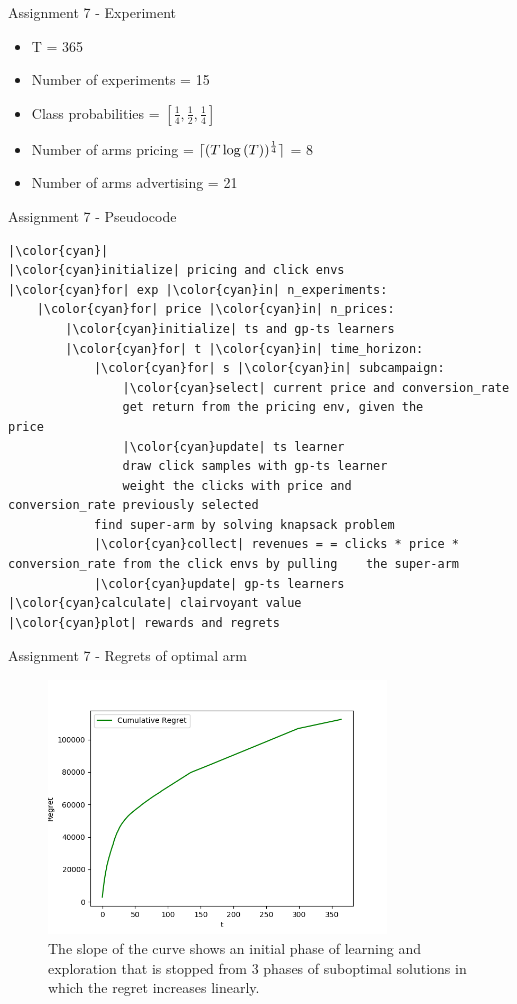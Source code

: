 \documentclass[11pt]{beamer}
\DeclarePairedDelimiter{\ceil}{\lceil}{\rceil}
\begin{document}
\begin{frame}{Assignment 7 - Experiment}
\begin{itemize}
\item T = 365
\item Number of experiments = 15
\item Class probabilities = \( \left[ \frac{1}{4}, \frac{1}{2}, \frac{1}{4} \right] \)
\item Number of arms pricing = $\ceil{(T \log{(T)})^{\frac{1}{4}}}$ = 8
\item Number of arms advertising = 21
\end{itemize}
\end{frame}

\begin{frame}[fragile]{Assignment 7 - Pseudocode}
\begin{lstlisting}
|\color{cyan}|
|\color{cyan}initialize| pricing and click envs
|\color{cyan}for| exp |\color{cyan}in| n_experiments:
	|\color{cyan}for| price |\color{cyan}in| n_prices:
		|\color{cyan}initialize| ts and gp-ts learners 
		|\color{cyan}for| t |\color{cyan}in| time_horizon:
			|\color{cyan}for| s |\color{cyan}in| subcampaign:
				|\color{cyan}select| current price and conversion_rate 
				get return from the pricing env, given the				price
				|\color{cyan}update| ts learner
				draw click samples with gp-ts learner
				weight the clicks with price and                   conversion_rate previously selected
			find super-arm by solving knapsack problem
			|\color{cyan}collect| revenues = = clicks * price *             conversion_rate from the click envs by pulling    the super-arm
			|\color{cyan}update| gp-ts learners 
|\color{cyan}calculate| clairvoyant value
|\color{cyan}plot| rewards and regrets
\end{lstlisting}
\end{frame}

\begin{frame}{Assignment 7 - Regrets of optimal arm}
\begin{figure}[hbtp]
\centering
\includegraphics[width=0.8\textwidth]{images/assignment_7_regrets_arm_3_cum_regret.png}
\caption{The slope of the curve shows an initial phase of learning and exploration that is stopped from 3 phases of suboptimal solutions in which the regret increases linearly.}
\end{figure}
\end{frame}
\end{document}
